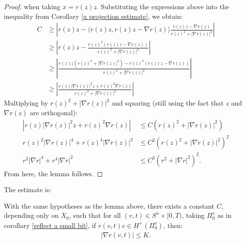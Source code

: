 \begin{proof}
	when taking $ x = r(z) z $. Substituting the expressions above into the inequality from Corollary \ref{x projection estimate}, we obtain:
	\begin{align*}
		C&\geq\left\vert r(z) z - \langle r(z) z ,  r(z) z - \nabla r(z) \rangle \frac{ r(z) z - \nabla r(z) }{r(z)^2  + |\nabla r(z)|^2} \right\vert \\
		&\geq\left\vert r(z) z -  \frac{ r(z)^2(r(z) z - \nabla r(z)) }{r(z)^2  + |\nabla r(z)|^2} \right\vert \\
		&\geq\left\vert\frac{ r(z) z (r(z)^2  + |\nabla r(z)|^2)  -r(z)^2(r(z) z - \nabla r(z)) }{r(z)^2  + |\nabla r(z)|^2} \right\vert \\
		&\geq\left\vert\frac{ r(z)|\nabla r(z)|^2z    + r(z)^2 \nabla r(z) }{r(z)^2  + |\nabla r(z)|^2} \right\vert
	\end{align*}
	Multiplying by $r(z)^2  + |\nabla r(z)|^2$ and squaring (still using the fact that $z$ and $\nabla r(z)$ are orthogonal):
	\begin{align*}
		\left\vert r(z)|\nabla r(z)|^2z  + r(z)^2 \nabla r(z) \right\vert &\leq C (r(z)^2  + |\nabla r(z)|^2)\\
		r(z)^2|\nabla r(z)|^4  + r(z)^4 |\nabla r(z)|^2  &\leq C^2 (r(z)^2  + |\nabla r(z)|^2)^2\\
		r^2 |\nabla r|^4 + r^4 |\nabla r|^2 &\leq C^2 (r^2 + |\nabla r|^2)^2.
	\end{align*}
	From here, the lemma follows.
\end{proof}

The estimate is:

\begin{proposition}
	With the same hypotheses as the lemma above, there exists a constant $ C $, depending only on $ X_0 $, such that for all $ (v, t) \in S^n \times [0, T) $, taking $\Pi_0^v$ as in corollary \ref{reflect a small bit}, if $ r(v, t) v \in \overline{H^+(\Pi_0^v)} $, then:
	\begin{align*}
		| \nabla r(v, t) | \leq K.
	\end{align*}
\end{proposition}

